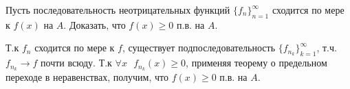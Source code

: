 \begin{task}{3}
Пусть последовательность неотрицательных функций $\{f_n\}_{n=1}^{\infty}$ сходится по мере к $f(x)$ на $A$. Доказать, что $f(x) \geqslant 0$ п.в. на $A$.
\end{task}

\begin{solution}
Т.к $f_n$ сходится по мере к $f$, существует подпоследовательность $\{f_{n_k}\}_{k=1}^{\infty}$, т.ч. $f_{n_k} \to f$ почти всюду. Т.к $\forall x \text{ }f_{n_k}(x) \geqslant 0$, применяя теорему о предельном переходе в неравенствах, получим, что $f(x) \geqslant 0$ п.в. на $A$.
\end{solution}